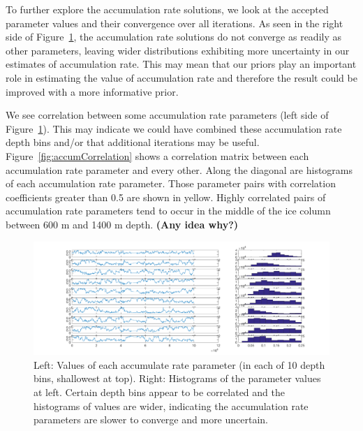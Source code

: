To further explore the accumulation rate solutions, we look at the accepted parameter values and their convergence over all iterations. As seen in the right side of Figure~\ref{fig:accumconvergence}, the accumulation rate solutions do not converge as readily as other parameters, leaving wider distributions exhibiting more uncertainty in our estimates of accumulation rate. This may mean that our priors play an important role in estimating the value of accumulation rate and therefore the result could be improved with a more informative prior. 

We see correlation between some accumulation rate parameters (left side of Figure~\ref{fig:accumconvergence}). This may indicate we could have combined these accumulation rate depth bins and/or that additional iterations may be useful. Figure~\ref{fig:accumCorrelation} shows a correlation matrix between each accumulation rate parameter and every other. Along the diagonal are histograms of each accumulation rate parameter. Those parameter pairs with correlation coefficients greater than 0.5 are shown in yellow. Highly correlated pairs of accumulation rate parameters tend to occur in the middle of the ice column between 600 m and 1400 m depth. \textbf{(Any idea why?)}

\begin{figure}[ht]
\centering
\includegraphics[scale=0.3]{../analysis/figures/convergence2}
\caption[]{Left: Values of each accumulate rate parameter (in each of 10 depth bins, shallowest at top). Right: Histograms of the parameter values at left. Certain depth bins appear to be correlated and the histograms of values are wider, indicating the accumulation rate parameters are slower to converge and more uncertain.}
\label{fig:accumconvergence}
\end{figure}

